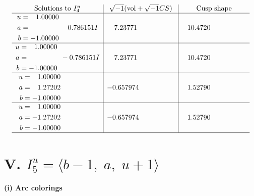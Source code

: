 \documentclass[1p]{elsarticle_modified}
\theoremstyle{definition}
\newcommand{\I}{\sqrt{-1}}
\begin{document}
$$\begin{array}{c|c|c}  
\text{Solutions to }I^u_{4}& \I (\text{vol} + \sqrt{-1}CS) & \text{Cusp shape}\\
 \hline 
\begin{aligned}
u &= \phantom{-}1.00000\phantom{ +0.000000I} \\
a &= \phantom{-0.000000 -}0.786151 I \\
b &= -1.00000\phantom{ +0.000000I}\end{aligned}
 & \phantom{-}7.23771\phantom{ +0.000000I} & \phantom{-}10.4720\phantom{ +0.000000I} \\ \hline\begin{aligned}
u &= \phantom{-}1.00000\phantom{ +0.000000I} \\
a &= \phantom{-0.000000 } -0.786151 I \\
b &= -1.00000\phantom{ +0.000000I}\end{aligned}
 & \phantom{-}7.23771\phantom{ +0.000000I} & \phantom{-}10.4720\phantom{ +0.000000I} \\ \hline\begin{aligned}
u &= \phantom{-}1.00000\phantom{ +0.000000I} \\
a &= \phantom{-}1.27202\phantom{ +0.000000I} \\
b &= -1.00000\phantom{ +0.000000I}\end{aligned}
 & -0.657974\phantom{ +0.000000I} & \phantom{-}1.52790\phantom{ +0.000000I} \\ \hline\begin{aligned}
u &= \phantom{-}1.00000\phantom{ +0.000000I} \\
a &= -1.27202\phantom{ +0.000000I} \\
b &= -1.00000\phantom{ +0.000000I}\end{aligned}
 & -0.657974\phantom{ +0.000000I} & \phantom{-}1.52790\phantom{ +0.000000I}\\
 \hline 
 \end{array}$$\newpage\newpage\renewcommand{\arraystretch}{1}
\centering \section*{V. $I^u_{5}= \langle b-1,\;a,\;u+1 \rangle$}
\flushleft \textbf{(i) Arc colorings}\\
\end{document}
